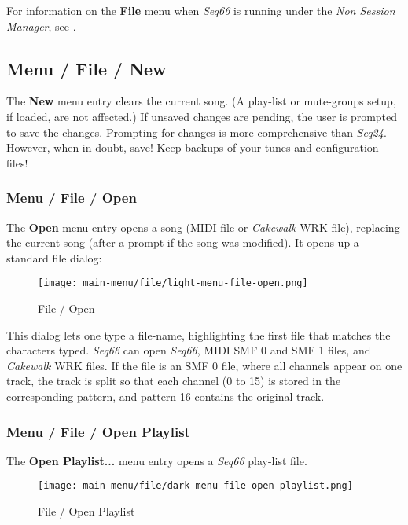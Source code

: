   For information on the \textbf{File} menu when \textsl{Seq66} is
   running under the \textsl{Non Session Manager}, see
   .

\subsection{Menu / File / New}
\label{subsec:menu_file_new}

   The \textbf{New} menu entry clears the current song.
   (A play-list or mute-groups setup, if loaded, are not affected.)
   If unsaved changes are pending, the user is prompted to save the changes.
   Prompting for changes is more comprehensive than \textsl{Seq24}.
   However, when in doubt, save!
   Keep backups of your tunes and configuration files!

\subsubsection{Menu / File / Open}
\label{subsubsec:menu_file_open}

   The \textbf{Open} menu entry opens a song (MIDI file or \textsl{Cakewalk}
   WRK file), replacing the current song (after a prompt if the song was
   modified).
   It opens up a standard file dialog:

\begin{figure}[H]
   \centering 
   \texttt{[image: main-menu/file/light-menu-file-open.png]}
   \caption{File / Open}
   \label{fig:menu_file_open}
\end{figure}

   This dialog lets one type a file-name, highlighting the first file
   that matches the characters typed.
   \textsl{Seq66} can open \textsl{Seq66}, MIDI SMF 0 and SMF 1 files, and
   \textsl{Cakewalk} WRK files.
   If the file is an SMF 0 file, where all channels appear on one track, the
   track is split so that each channel (0 to 15) is stored in the corresponding
   pattern, and pattern 16 contains the original track.

\subsubsection{Menu / File / Open Playlist}
\label{subsubsec:menu_file_open_playlist}

   The \textbf{Open Playlist...} menu entry opens a \textsl{Seq66}
   play-list file.

\begin{figure}[H]
   \centering 
   \texttt{[image: main-menu/file/dark-menu-file-open-playlist.png]}
   \caption{File / Open Playlist}
   \label{fig:menu_file_open_playlist}
\end{figure}

